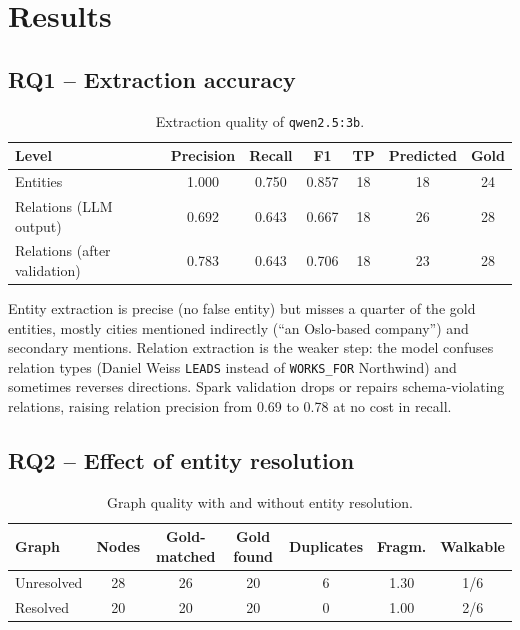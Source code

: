 \documentclass[11pt,a4paper]{report}
\newcommand{\RQ}[1]{\textbf{RQ#1}}
\begin{document}
\chapter{Results}\label{ch:results}

\section{\RQ{1} -- Extraction accuracy}
\begin{table}[ht]
\centering
\begin{tabular}{lcccccc}
\toprule
\textbf{Level} & \textbf{Precision} & \textbf{Recall} & \textbf{F1} & \textbf{TP} & \textbf{Predicted} & \textbf{Gold} \\
\midrule
Entities & 1.000 & 0.750 & 0.857 & 18 & 18 & 24 \\
Relations (LLM output) & 0.692 & 0.643 & 0.667 & 18 & 26 & 28 \\
Relations (after validation) & 0.783 & 0.643 & 0.706 & 18 & 23 & 28 \\
\bottomrule
\end{tabular}
\caption{Extraction quality of \texttt{qwen2.5:3b}.}
\label{tab:rq1}
\end{table}

Entity extraction is precise (no false entity) but misses a quarter of the gold entities, mostly cities mentioned
indirectly (``an Oslo-based company'') and secondary mentions. Relation extraction is the weaker step: the model
confuses relation types (Daniel Weiss \texttt{LEADS} instead of \texttt{WORKS\_FOR} Northwind) and sometimes reverses
directions. Spark validation drops or repairs schema-violating relations, raising relation precision from 0.69 to
0.78 at no cost in recall.

\section{\RQ{2} -- Effect of entity resolution}
\begin{table}[ht]
\centering
\small
\begin{tabular}{lcccccc}
\toprule
\textbf{Graph} & \textbf{Nodes} & \textbf{Gold-matched} & \textbf{Gold found} & \textbf{Duplicates} & \textbf{Fragm.} & \textbf{Walkable} \\
\midrule
Unresolved & 28 & 26 & 20 & 6 & 1.30 & 1/6 \\
Resolved & 20 & 20 & 20 & 0 & 1.00 & 2/6 \\
\bottomrule
\end{tabular}
\caption{Graph quality with and without entity resolution.}
\label{tab:rq2}
\end{table}
\end{document}

